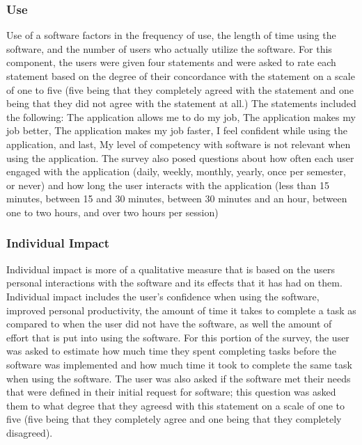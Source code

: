\subsubsection{Use}
Use of a software factors in the frequency of use, the length of time using the software, and the number of users who actually utilize the software. For this component, the users were given four statements and were asked to rate each statement based on the degree of their concordance with the statement on a scale of one to five (five being that they completely agreed with the statement and one being that they did not agree with the statement at all.) The statements included the following: The application allows me to do my job, The application makes my job better, The application makes my job faster, I feel confident while using the application,  and last, My level of competency with software is not relevant when using the application. The survey also posed questions about how often each user engaged with the application (daily, weekly, monthly, yearly, once per semester, or never)  and how long the user interacts with the application (less than 15 minutes, between 15 and 30 minutes, between 30 minutes and an hour, between one to two hours, and over two hours per session)

\subsubsection{Individual Impact}
Individual impact is more of a qualitative measure that is based on the users personal interactions with the software and its effects that it has had on them. Individual impact includes the user's confidence when using the software, improved personal productivity, the amount of time it takes to complete a task as compared to when the user did not have the software, as well the amount of effort that is put into using the software. For this portion of the survey, the user was asked to estimate how much time they spent completing tasks before the software was implemented and how much time it took to complete the same task when using the software. The user was also asked if the software met their needs that were defined in their initial request for software; this question was asked them to what degree that they agreesd with this statement on a scale of one to five (five being that they completely agree and one being that they completely disagreed).


